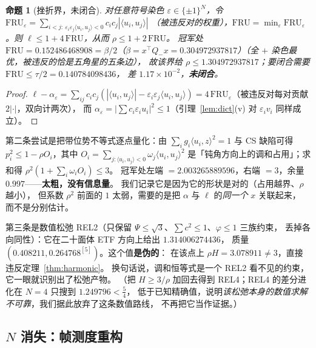 \documentclass[UTF8,11pt]{ctexart}
\newtheorem{proposition}[theorem]{命题}
\theoremstyle{definition}
\begin{document}
\begin{proposition}[挫折界，未闭合]\label{prop:frustration}
对任意符号染色 $\varepsilon\in\{\pm1\}^N$，令
$\mathrm{FRU}_\varepsilon=\sum_{i<j:\ \varepsilon_i\varepsilon_j\langle u_i,u_j\rangle<0}c_ic_j|\langle u_i,u_j\rangle|$
（被违反对的权重），$\mathrm{FRU}=\min_\varepsilon\mathrm{FRU}_\varepsilon$。则
$\ell\le1+4\,\mathrm{FRU}$，从而 $\rho\le1+2\,\mathrm{FRU}$。
冠军处 $\mathrm{FRU}=0.152486468908=\beta/2$（$\beta=x^\top Q_-x=0.304972937817$）（全 $+$ 染色最优，被违反的恰是五角星的五条边），
故该界给 $\rho\le1.304972937817$；要闭合需要 $\mathrm{FRU}\le\tau/2=0.140784098436$，
差 $1.17\times10^{-2}$，\textbf{未闭合}。
\end{proposition}

\begin{proof}
$\ell-\alpha_\varepsilon=\sum_{ij}c_ic_j(|\langle u_i,u_j\rangle|-\varepsilon_i\varepsilon_j\langle u_i,u_j\rangle)
=4\,\mathrm{FRU}_\varepsilon$（被违反对每对贡献 $2|\cdot|$，双向计两次），
而 $\alpha_\varepsilon=|\sum c_i\varepsilon_iu_i|^2\le1$（引理~\ref{lem:dict}(v) 对 $\varepsilon_i v_i$ 同样成立）。
\end{proof}

第二条尝试是把带位势不等式逐点量化：由 $\sum_ig_i\langle u_i,z\rangle^2=1$ 与 CS 缺陷可得
$p_i^2\le1-\rho O_i$，其中 $O_i=\sum_{j:\langle u_i,u_j\rangle<0}\omega_j\langle u_i,u_j\rangle^2$
是「钝角方向上的调和占用」；求和得 $\rho^2(1+\sum_i\omega_iO_i)\le3$。
冠军处左端 $=2.003265889596$，右端 $=3$，余量 $0.997$——\textbf{太粗，没有信息量}。
我们记录它是因为它的形状是对的（占用越界、$\rho$ 越小），
但系数 $\rho^2$ 前面的 $1$ 太弱，需要的是把 $\alpha$ 与 $\ell$ 的\emph{同一个} $x$ 关联起来，
而不是分别估计。

第三条是数值松弛 REL2（只保留 $\Psi\le\sqrt3$、$\sum c^2\le1$、$\varphi\le1$ 三族约束，
丢掉各向同性）：它在二十面体 ETF 方向上给出 $1.314006274436$，
质量 $(0.408211,0.264768^{[5]})$。这个值\textbf{是伪的}：
在该点上 $\rho H=3.078911\ne3$，直接违反定理~\ref{thm:harmonic}。
换句话说，调和恒等式是一个 REL2 看不见的约束，它一眼就识别出了松弛产物。
（把 $H\ge3/\rho$ 加回去得到 REL4；REL4 的差分进化在 $N=4$ 只搜到 $1.249796<\frac54$，
低于已知精确值，说明\emph{该松弛本身的数值求解不可靠}，我们据此放弃了这条数值路线，
不再把它当作证据。）


\subsection{$N$ 消失：帧测度重构}\label{sec:harm:nfree}
\end{document}
